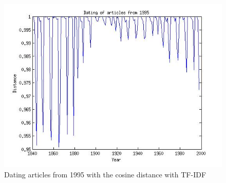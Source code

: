 \begin{figure}[H]
\begin{minipage}[b]{0.3\linewidth}
	\includegraphics[scale=0.25]{Pictures/date_articles/cos/dating1995_tfidf.jpg}
        \caption{Dating articles from 1995 with the cosine distance with TF-IDF}
    \end{minipage}
    \label{date_d1}
\end{figure}